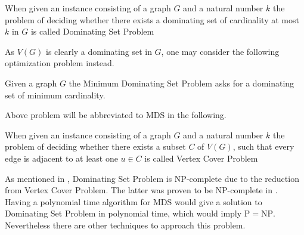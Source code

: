 \begin{definition}
When given an instance consisting of a graph $G$ and a natural number $k$ the problem of deciding whether there exists a dominating set of cardinality at most $k$ in $G$ is called Dominating Set Problem \cite{Garey90}
\end{definition}
As $V(G)$ is clearly a dominating set in $G$, one may consider the following optimization problem instead.
\begin{definition}
Given a graph $G$ the Minimum Dominating Set Problem asks for a dominating set of minimum cardinality.
\end{definition}
Above problem will be abbreviated to MDS in the following.
\begin{definition}
When given an instance consisting of a graph $G$ and a natural number $k$ the problem of deciding whether there exists a subset $C$ of $V(G)$, such that every edge is adjacent to at least one $u \in C$  is called Vertex Cover Problem \cite{Garey90}
\end{definition}
As mentioned in \citeauthor{Garey90} \cite{Garey90}, Dominating Set Problem is NP-complete due to the reduction from Vertex Cover Problem. The latter was proven to be NP-complete in \cite{Karp1972}. Having a polynomial time algorithm for MDS would give a solution to Dominating Set Problem in polynomial time, which would imply $\mathrm{P} = \mathrm{NP}$. Nevertheless there are other techniques to approach this problem. 
